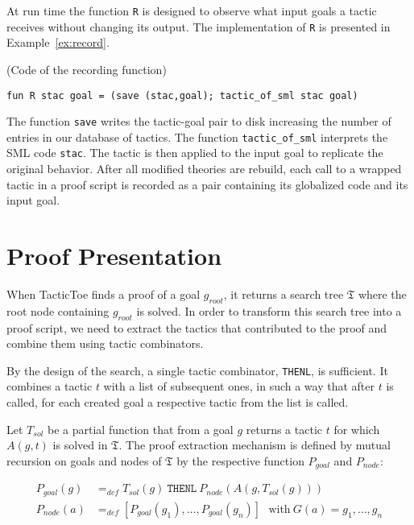 \documentclass[runningheads,a4paper,draft]{svjour3}
\def\sml{\textsf{SML}\xspace}
\def\tactictoe{\textsf{TacticToe}\xspace}
\begin{document}
At run time the function \texttt{R} is designed to observe what input goals a
tactic  receives without changing its output. The implementation of \texttt{R}
is presented in Example~\ref{ex:record}.

\begin{example}\label{ex:record} (Code of the recording function)
\begin{lstlisting}[language=SMLSmall]
fun R stac goal = (save (stac,goal); tactic_of_sml stac goal)
\end{lstlisting}
\end{example}

The function \texttt{save} writes the tactic-goal pair to disk increasing the
number of entries in our database of tactics. The function
\texttt{tactic\_of\_sml} interprets the \sml code \texttt{stac}. The tactic is
then applied to the input goal to replicate the original behavior.
After all modified theories are rebuild, each call to a wrapped tactic in a
proof script is recorded as a pair containing its globalized code and its
input goal.



\section{Proof Presentation}\label{sec:proofdisplay}

When \tactictoe finds a proof of a goal $g_{root}$, it returns a search tree
$\mathfrak{T}$ where the root node containing $g_{root}$ is solved.
In order to transform this search tree into a proof script, we need to extract
the tactics that contributed to the proof and combine them using tactic
combinators.

By the design of the search, a single tactic combinator, \texttt{THENL}, is
sufficient. It combines a tactic $t$ with a list of subsequent ones, in such a
way that after $t$ is called, for each created goal a respective
tactic from the list is called.

Let $T_{sol}$ be a partial function that from a goal $g$ returns a tactic $t$
for which $A(g,t)$ is solved in $\mathfrak{T}$.
The proof extraction mechanism is defined by mutual
recursion on goals and nodes of $\mathfrak{T}$ by the respective function
$P_{goal}$ and $P_{node}$:

\begin{align*}
P_{goal}(g) &=_{def} T_{sol}(g)\ \texttt{THENL}\ P_{node}(A(g,T_{sol}(g)))\\
P_{node}(a) &=_{def} [P_{goal}(g_1),\ldots,P_{goal}(g_n)]\ \ \ \text{with}\
G(a) = g_1,\ldots,g_n\\
\end{align*}
\end{document}
